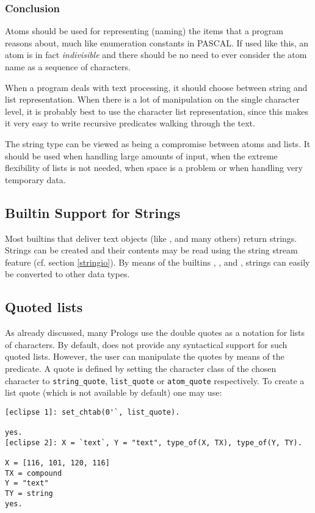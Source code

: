 \subsubsection{Conclusion}
Atoms should be used for representing (naming) the items that a
program reasons about, much like enumeration constants in PASCAL.
If used like this, an atom is in fact {\em indivisible} and there should
be no need to ever consider the atom name as a sequence of characters.

When a program deals with text processing, it should choose between string
and list representation.
When there is a lot of
manipulation on the single character level, it is probably best to use
the character list representation, since this
makes it very easy to write recursive predicates walking through the text.

The string type can be viewed as being a compromise between atoms and lists.
It should be used when handling large amounts of input, when the extreme
flexibility of lists is not needed, when space is a problem or when
handling very temporary data.


\subsection{Builtin Support for Strings}
Most {\eclipse} builtins that deliver text objects (like
,
 and many others) return strings.
Strings can be created and their contents may be read using the string
stream feature (cf. section \ref{stringio}).
By means of the builtins
,
,
 and
,
strings can easily be converted to other data types.

\subsection{Quoted lists}

As already discussed, many Prologs use the double quotes as a notation for
lists of characters. By default, {\eclipse} does not provide any
syntactical support for such quoted lists. However, the  user can
manipulate the quotes by means of the 
predicate.
A quote is defined by setting the character class of the chosen character
to {\tt string_quote}, {\tt list_quote} or {\tt atom_quote} respectively.
To create a list quote (which is not available by default)
one may use:
\begin{verbatim}
[eclipse 1]: set_chtab(0'`, list_quote).

yes.
[eclipse 2]: X = `text`, Y = "text", type_of(X, TX), type_of(Y, TY).

X = [116, 101, 120, 116]
TX = compound
Y = "text"
TY = string
yes.
\end{verbatim}


